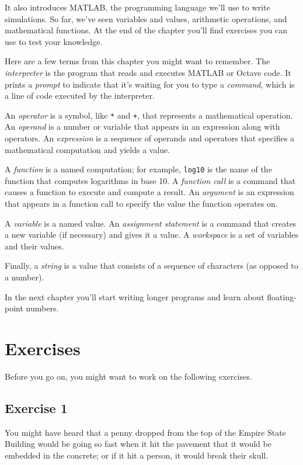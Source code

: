 It also introduces MATLAB, the programming language we'll use to write simulations.  So far, we've seen variables and values, arithmetic operations, and mathematical functions.  At the end of the chapter you'll find exercises you can use to test your knowledge.

Here are a few terms from this chapter you might want to remember.
The {\em interpreter} is the program that reads and executes MATLAB or Octave code.
It prints a {\em prompt} to indicate that it's waiting for you to type a {\em command}, which is a line of code executed by the interpreter.

An {\em operator} is a symbol, like \lstinline{*} and \lstinline{+}, that
represents a mathematical operation.
An {\em operand} is a number or variable that appears in an expression along
with operators.
An {\em expression} is a sequence of operands and operators that specifies
a mathematical computation and yields a value.

A {\em function} is a named computation; for example, \lstinline{log10} is the
name of the function that computes logarithms in base 10.
A {\em function call} is a command that causes a function to execute and compute a result.
An {\em argument} is an expression that appears in a function call to
specify the value the function operates on.

A {\em variable} is a named value. An {\em assignment statement} is a command that creates a new variable (if necessary) and gives it a value.
A {\em workspace} is a set of variables and their values.

Finally, a {\em string} is a value that consists of a sequence of characters (as opposed to a number).

In the next chapter you'll start writing longer programs and learn about floating-point numbers.

\section{Exercises}

Before you go on, you might want to work on the following exercises.

\subsection{Exercise 1}
\label{penny}
You might have heard that a penny dropped from the top of the Empire State Building would be going so fast when it hit the pavement that it would be embedded in the concrete; or if it hit a person, it would break their skull.

